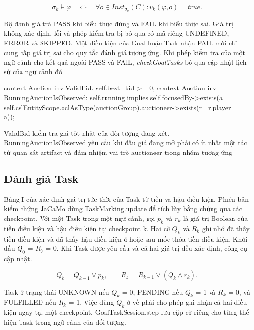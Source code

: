 \documentclass[12pt,a4paper,oneside]{extreport}
\newcommand{\thesisdisplaytitle}[2]{%
  \par\smallskip\noindent\makebox[\linewidth][c]{\small\textbf{#1}\ #2}\par\nobreak}
\begin{document}
\[\sigma_{k} \vDash \varphi\quad \Leftrightarrow \quad\forall o \in {Inst}_{\sigma_{k}}(C):v_{k}(\varphi,o) = true.\]

Bộ đánh giá trả PASS khi biểu thức đúng và FAIL khi biểu thức sai. Giá trị không xác định, lỗi và phép kiểm tra bị bỏ qua có mã riêng UNDEFINED, ERROR và SKIPPED. Một điều kiện của Goal hoặc Task nhận FAIL mới chỉ cung cấp giá trị sai cho quy tắc đánh giá tương ứng. Khi phép kiểm tra của một ngữ cảnh cho kết quả ngoài PASS và FAIL, \textit{checkGoalTasks} bỏ qua cập nhật lịch sử của ngữ cảnh đó.

\begin{samepage}

\thesisdisplaytitle{Đoạn mã 2.2}{Bất biến của Auction}

\begin{thesiscode}
context Auction inv ValidBid:
    self.best_bid >= 0;
context Auction inv RunningAuctionIsObserved:
    self.running implies self.focusedBy->exists(a |
        self.cslEntityScope.oclAsType(auctionGroup).auctioneer->exists(r | r.player = a));
\end{thesiscode}

\end{samepage}

ValidBid kiểm tra giá tốt nhất của đối tượng đang xét. RunningAuctionIsObserved yêu cầu khi đấu giá đang mở phải có ít nhất một tác tử quan sát artifact và đảm nhiệm vai trò auctioneer trong nhóm tương ứng.

\subsection{Đánh giá Task}\label{sec:2-7-2}

Bảng I của \cite{ref-28} xác định giá trị tức thời của Task từ tiền và hậu điều kiện. Phiên bản kiểm chứng JaCaMo dùng TaskMarking.update để tích lũy bằng chứng qua các checkpoint. Với một Task trong một ngữ cảnh, gọi \(p_{k}\) và \(r_{k}\) là giá trị Boolean của tiền điều kiện và hậu điều kiện tại checkpoint k. Hai cờ \(Q_{k}\) và \(R_{k}\) ghi nhớ đã thấy tiền điều kiện và đã thấy hậu điều kiện ở hoặc sau mốc thỏa tiền điều kiện. Khởi đầu \(Q_{0}\) = \(R_{0}\) = 0. Khi Task được yêu cầu và cả hai giá trị đều xác định, công cụ cập nhật.

\[Q_{k} = Q_{k - 1} \vee p_{k},\quad\quad R_{k} = R_{k - 1} \vee \left( Q_{k} \land r_{k} \right).\]

Task ở trạng thái UNKNOWN nếu \(Q_{k}\) = 0, PENDING nếu \(Q_{k}\) = 1 và \(R_{k}\) = 0, và FULFILLED nếu \(R_{k}\) = 1. Việc dùng \(Q_{k}\) ở vế phải cho phép ghi nhận cả hai điều kiện ngay tại một checkpoint. GoalTaskSession.step lưu cặp cờ riêng cho từng thể hiện Task trong ngữ cảnh của đối tượng.
\end{document}
